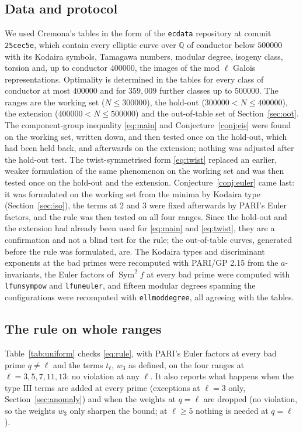 \documentclass[11pt]{amsart}
\theoremstyle{definition}
\newcommand{\Q}{\mathbb{Q}}
\newcommand{\Sym}{\operatorname{Sym}^2}
\begin{document}
\subsection{Data and protocol}
We used Cremona's tables \cite{Cremona97} in the form of the \texttt{ecdata} repository at commit \texttt{25cec5e}, which contain every elliptic curve over $\Q$ of conductor below $500000$ with its Kodaira symbols, Tamagawa numbers, modular degree, isogeny class, torsion and, up to conductor $400000$, the images of the mod $\ell$ Galois representations. Optimality is determined in the tables for every class of conductor at most $400000$ and for $359{,}009$ further classes up to $500000$. The ranges are the working set ($N\le300000$), the hold-out ($300000<N\le400000$), the extension ($400000<N\le500000$) and the out-of-table set of Section~\ref{sec:oot}. The component-group inequality \eqref{eq:main} and Conjecture~\ref{conj:eis} were found on the working set, written down, and then tested once on the hold-out, which had been held back, and afterwards on the extension; nothing was adjusted after the hold-out test. The twist-symmetrised form \eqref{eq:twist} replaced an earlier, weaker formulation of the same phenomenon on the working set and was then tested once on the hold-out and the extension. Conjecture~\ref{conj:euler} came last: it was formulated on the working set from the minima by Kodaira type (Section~\ref{sec:iso}), the terms at $2$ and $3$ were fixed afterwards by PARI's Euler factors, and the rule was then tested on all four ranges. Since the hold-out and the extension had already been used for \eqref{eq:main} and \eqref{eq:twist}, they are a confirmation and not a blind test for the rule; the out-of-table curves, generated before the rule was formulated, are. The Kodaira types and discriminant exponents at the bad primes were recomputed with PARI/GP 2.15 \cite{PARI} from the $a$-invariants, the Euler factors of $\Sym f$ at every bad prime were computed with \texttt{lfunsympow} and \texttt{lfuneuler}, and fifteen modular degrees spanning the configurations were recomputed with \texttt{ellmoddegree}, all agreeing with the tables.

\subsection{The rule on whole ranges}
Table~\ref{tab:uniform} checks \eqref{eq:rule}, with PARI's Euler factors at every bad prime $q\ne\ell$ and the terms $t_\ell$, $w_3$ as defined, on the four ranges at $\ell=3,5,7,11,13$: no violation at any $\ell$. It also reports what happens when the type $\mathrm{III}$ terms are added at every prime (exceptions at $\ell=3$ only, Section~\ref{sec:anomaly}) and when the weights at $q=\ell$ are dropped (no violation, so the weights $w_3$ only sharpen the bound; at $\ell\ge5$ nothing is needed at $q=\ell$).
\end{document}
